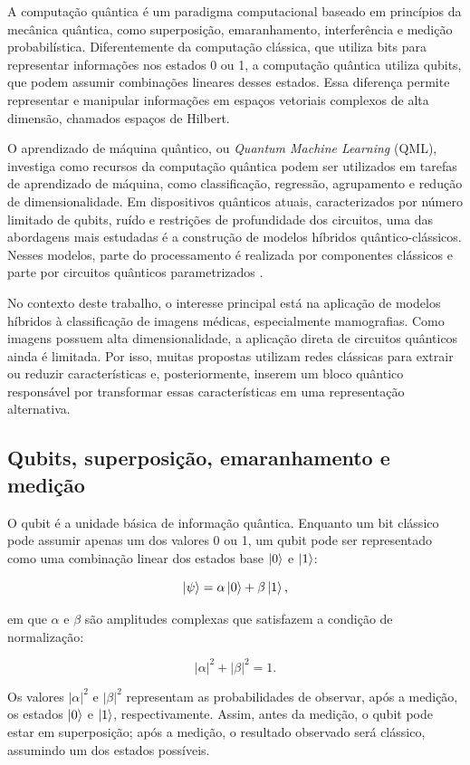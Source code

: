 \documentclass[
    12pt,
    openright,
    oneside,
    a4paper,
    english,
    brazil
]{abntex2}
\begin{document}
A computação quântica é um paradigma computacional baseado em princípios da mecânica quântica, como superposição, emaranhamento, interferência e medição probabilística. Diferentemente da computação clássica, que utiliza bits para representar informações nos estados 0 ou 1, a computação quântica utiliza qubits, que podem assumir combinações lineares desses estados. Essa diferença permite representar e manipular informações em espaços vetoriais complexos de alta dimensão, chamados espaços de Hilbert.

O aprendizado de máquina quântico, ou \textit{Quantum Machine Learning} (QML), investiga como recursos da computação quântica podem ser utilizados em tarefas de aprendizado de máquina, como classificação, regressão, agrupamento e redução de dimensionalidade. Em dispositivos quânticos atuais, caracterizados por número limitado de qubits, ruído e restrições de profundidade dos circuitos, uma das abordagens mais estudadas é a construção de modelos híbridos quântico-clássicos. Nesses modelos, parte do processamento é realizada por componentes clássicos e parte por circuitos quânticos parametrizados \cite{biamonte2017qml,preskill2018nisq,cerezo2021variational}.

No contexto deste trabalho, o interesse principal está na aplicação de modelos híbridos à classificação de imagens médicas, especialmente mamografias. Como imagens possuem alta dimensionalidade, a aplicação direta de circuitos quânticos ainda é limitada. Por isso, muitas propostas utilizam redes clássicas para extrair ou reduzir características e, posteriormente, inserem um bloco quântico responsável por transformar essas características em uma representação alternativa.

\subsection{Qubits, superposição, emaranhamento e medição}

O qubit é a unidade básica de informação quântica. Enquanto um bit clássico pode assumir apenas um dos valores 0 ou 1, um qubit pode ser representado como uma combinação linear dos estados base \(\ket{0}\) e \(\ket{1}\):

\[
\ket{\psi} = \alpha\ket{0} + \beta\ket{1},
\]

em que \(\alpha\) e \(\beta\) são amplitudes complexas que satisfazem a condição de normalização:

\[
|\alpha|^2 + |\beta|^2 = 1.
\]

Os valores \(|\alpha|^2\) e \(|\beta|^2\) representam as probabilidades de observar, após a medição, os estados \(\ket{0}\) e \(\ket{1}\), respectivamente. Assim, antes da medição, o qubit pode estar em superposição; após a medição, o resultado observado será clássico, assumindo um dos estados possíveis.
\end{document}
